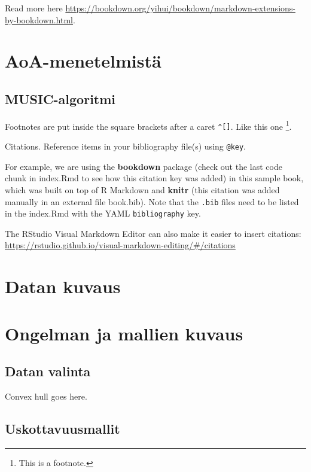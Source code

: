 \documentclass[
  12pt,
  a4paper, twoside]{book}
\theoremstyle{definition}
\theoremstyle{definition}
\theoremstyle{definition}
\theoremstyle{definition}
\theoremstyle{remark}
\begin{document}
Read more here \url{https://bookdown.org/yihui/bookdown/markdown-extensions-by-bookdown.html}.

\hypertarget{aoa-menetelmistuxe4}{%
\section{AoA-menetelmistä}\label{aoa-menetelmistuxe4}}

\hypertarget{music-algoritmi}{%
\subsection{MUSIC-algoritmi}\label{music-algoritmi}}

Footnotes are put inside the square brackets after a caret \texttt{\^{}{[}{]}}. Like this one \footnote{This is a footnote.}.

Citations. Reference items in your bibliography file(s) using \texttt{@key}.

For example, we are using the \textbf{bookdown} package \citep{R-bookdown} (check out the last code chunk in index.Rmd to see how this citation key was added) in this sample book, which was built on top of R Markdown and \textbf{knitr} \citep{xie2015} (this citation was added manually in an external file book.bib).
Note that the \texttt{.bib} files need to be listed in the index.Rmd with the YAML \texttt{bibliography} key.

The RStudio Visual Markdown Editor can also make it easier to insert citations: \url{https://rstudio.github.io/visual-markdown-editing/\#/citations}

\hypertarget{datan-kuvaus}{%
\section{Datan kuvaus}\label{datan-kuvaus}}

\hypertarget{ongelman-ja-mallien-kuvaus}{%
\section{Ongelman ja mallien kuvaus}\label{ongelman-ja-mallien-kuvaus}}

\hypertarget{datan-valinta}{%
\subsection{Datan valinta}\label{datan-valinta}}

Convex hull goes here.

\hypertarget{uskottavuusmallit}{%
\subsection{Uskottavuusmallit}\label{uskottavuusmallit}}
\end{document}
